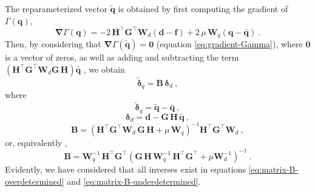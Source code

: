 The reparameterized vector $\tilde{\mathbf{q}}$ is obtained by first computing the gradient of $\Gamma(\mathbf{q})$,
\begin{equation}
	\boldsymbol{\nabla} \Gamma(\mathbf{q}) = 
	-2 \, \mathbf{H}^{\top}\mathbf{G}^{\top} \mathbf{W}_{d} \left(\mathbf{d} - \mathbf{f} \right) +
	2 \, \mu \, \mathbf{W}_{q} \left( \mathbf{q} - \bar{\mathbf{q}} \right) \: .
	\label{eq:gradient-Gamma}
\end{equation}
Then, by considering that $\boldsymbol{\nabla} \Gamma(\tilde{\mathbf{q}}) = \mathbf{0}$ (equation \ref{eq:gradient-Gamma}),
where $\mathbf{0}$ is a vector of zeros, as well as adding and subtracting the term
$\left( \mathbf{H}^{\top}\mathbf{G}^{\top}\mathbf{W}_{d} \mathbf{G} \, \mathbf{H} \right) \bar{\mathbf{q}}$ ,
we obtain
\begin{equation}
	\tilde{\boldsymbol{\delta}}_{q} = \mathbf{B} \, \boldsymbol{\delta}_{d} \: ,
	\label{eq:vector-q-tilde}
\end{equation}
where 
\begin{equation}
	\tilde{\boldsymbol{\delta}}_{q} = \tilde{\mathbf{q}} - \bar{\mathbf{q}} \: ,
	\label{eq:delta-q-tilde}
\end{equation}
\begin{equation}
	\boldsymbol{\delta}_{d} = \mathbf{d} - \mathbf{G} \, \mathbf{H} \, \bar{\mathbf{q}} \: ,
	\label{eq:delta-d}
\end{equation}
\begin{equation}
	\mathbf{B} = \left( \mathbf{H}^{\top} \mathbf{G}^{\top} \mathbf{W}_{d} \, \mathbf{G} \, \mathbf{H} + 
	\mu \, \mathbf{W}_{q} \right)^{-1}
	\mathbf{H}^{\top} \mathbf{G}^{\top} \mathbf{W}_{d} \: ,
	\label{eq:matrix-B-overdetermined}
\end{equation}
or, equivalently \cite[][p. 62]{menke2018},
\begin{equation}
	\mathbf{B} = \mathbf{W}_{q}^{-1} \, \mathbf{H}^{\top} \mathbf{G}^{\top}
	\left( \mathbf{G} \, \mathbf{H} \, \mathbf{W}_{q}^{-1} \,
	\mathbf{H}^{\top}\mathbf{G}^{\top} + \mu \mathbf{W}_{d}^{-1} \right)^{-1} \: .
	\label{eq:matrix-B-underdetermined}
\end{equation}
Evidently, we have considered that all inverses exist in equations \ref{eq:matrix-B-overdetermined} and \ref{eq:matrix-B-underdetermined}.

